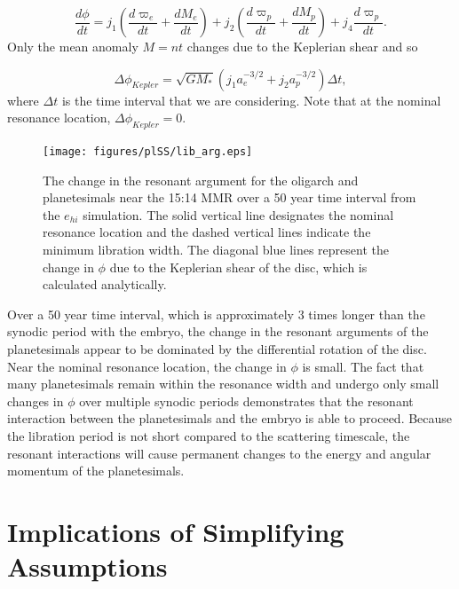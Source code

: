 \begin{equation}\label{eq:res_arg1}
    \frac{d \phi}{dt} = j_{1} \left( \frac{d \varpi_{e}}{dt} + \frac{d M_{e}}{dt} \right) + j_{2} \left( \frac{d \varpi_{p}}{dt} + \frac{d M_{p}}{dt} \right) + j_{4} \frac{d \varpi_{p}}{dt}.
\end{equation} Only the mean anomaly $M = n t$ changes due to the Keplerian shear and so

\begin{equation}
    \Delta \phi_{Kepler} = \sqrt{G M_{*}} \left( j_{1} a_{e}^{-3/2} + j_{2} a_{p}^{-3/2} \right) \Delta t,
\end{equation} where $\Delta t$ is the time interval that we are considering. Note that at the nominal resonance location, $\Delta \phi_{Kepler} = 0$.

\begin{figure}
    \begin{centering}
    \texttt{[image: figures/plSS/lib\_arg.eps]}
    \caption{The change in the resonant argument for the oligarch and planetesimals near the 15:14 MMR over a 50 year time 
    interval from the $e_{hi}$ simulation. The solid vertical line designates the nominal resonance location and the dashed vertical 
    lines indicate the minimum libration width. The diagonal blue lines represent the change in $\phi$ due to the Keplerian shear 
    of the disc, which is calculated analytically.}
    \label{fig:lib_arg}
    \end{centering}
\end{figure}

Over a 50 year time interval, which is approximately 3 times longer than the synodic period with the embryo, the change in the 
resonant arguments of the planetesimals appear to be dominated by the differential rotation of the disc. Near the nominal 
resonance location, the change in $\phi$ is small. The fact that many planetesimals remain within the resonance width and 
undergo only small changes in $\phi$ over multiple synodic periods demonstrates that the resonant interaction between the 
planetesimals and the embryo is able to proceed. Because the libration period is not short compared to the scattering timescale, 
the resonant interactions will cause permanent changes to the energy and angular momentum of the planetesimals.

\section{Implications of Simplifying Assumptions}\label{sec:assumptions}

